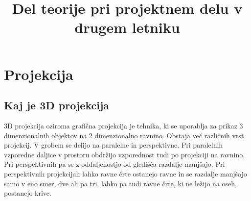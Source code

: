 \documentclass[a4paper, 12px]{article}
\title{Del teorije pri projektnem delu v drugem letniku}
\begin{document}
\maketitle
\tableofcontents

\section{Projekcija}
\subsection{Kaj je 3D projekcija}
    3D projekcija oziroma grafična projekcija je tehnika, ki se uporablja za prikaz 3 dimenzionalnih objektov na 
    2 dimenzionalno ravnino. Obstaja več različnih vrst projekcij. V grobem se delijo na paralelne 
    in perspektivne. Pri paralelnih vzporedne daljice v prostoru obdržijo vzporednost tudi po 
    projekciji na ravnino. Pri perspektivnih pa se z oddaljenostjo od gledišča razdalje manjšajo.
    Pri perspektivnih projekcijah lahko ravne črte ostanejo ravne in se razdalje manjšajo samo v 
    eno smer, dve ali pa tri, lahko pa tudi ravne črte, ki ne ležijo na oseh, postanejo krive.
    \cite{3D-projection}
\end{document}

